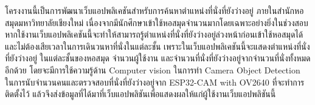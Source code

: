 \maketitle
\makesignature

\ifproject
\begin{abstractTH}
    โครงงานนี้เป็นการพัฒนาเว็บแอปพลิเคชันสำหรับการค้นหาตำแหน่งที่นั่งที่ยังว่างอยู่ 
    \enskip ภายในสำนักหอสมุดมหาวิทยาลัยเชียงใหม่ 
    เนื่องจากมีนักศึกษาเข้าใช้หอสมุดจำนวนมากโดยเฉพาะอย่างยิ่งในช่วงสอบ 
    หากใช้งานเว็บแอปพลิเคชันนี้จะทำให้สามารถรู้ตำแหน่งที่นั่งที่ยังว่างอยู่ล่วงหน้าก่อนเข้าใช้หอสมุดได้ 
    และไม่ต้องเสียเวลาในการเดินวนหาที่นั่งในแต่ละชั้น เพราะในเว็บแอปพลิเคชันนี้จะแสดงตำแหน่งที่นั่งที่ยังว่างอยู่
    \enskip ในแต่ละชั้นของหอสมุด จำนวนผู้ใช้งาน และจำนวนที่นั่งที่ยังว่างอยู่จากจำนวนที่นั่งทั้งหมดอีกด้วย 
    โดยจะมีการใช้ความรู้ด้าน Computer vision ในการทำ Camera Object Detection 
    ในการนับจำนวนคนและตรวจสอบที่นั่งที่ยังว่างอยู่จาก ESP32-CAM with OV2640 ที่จะทำการติดตั้งไว้ 
    แล้วจึงส่งข้อมูลที่ได้มาที่เว็บแอปพลิชันเพื่อแสดงผลให้แก่ผู้ใช้งานเว็บแอปพลิชันนี้    
\end{abstractTH}

\iffalse
\begin{dedication}
This document is dedicated to all Chiang Mai University students.

Dedication page is optional.
\end{dedication}
\fi %

\contentspage

\ifproject
\figurelistpage
\fi %



